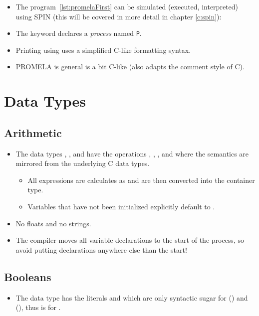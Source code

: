 		\begin{itemize}
			\item The program~\ref{lst:promelaFirst} can be simulated (executed, interpreted) using SPIN (this will be covered in more detail in chapter \ref{c:spin}):
			\item The keyword  declares a \textit{process} named \texttt{P}.
			\item Printing using  uses a simplified C-like formatting syntax.
			\item PROMELA is general is a bit C-like (also adapts the comment style of C).
		\end{itemize}

	\section{Data Types}
		\subsection{Arithmetic}
			\begin{itemize}
				\item The data types , ,  and  have the operations \inlinePromela{+}, \inlinePromela{-}, \inlinePromela{*}, \inlinePromela{/} and \inlinePromela{\%} where the semantics are mirrored from the underlying C data types.
					\begin{itemize}
						\item All expressions are calculates as  and are then converted into the container type.
						\item Variables that have not been initialized explicitly default to .
					\end{itemize}
				\item No floats and no strings.
				\item The compiler moves all variable declarations to the start of the process, so avoid putting declarations anywhere else than the start!
			\end{itemize}

		\subsection{Booleans}
			\begin{itemize}
				\item The data type  has the literals  and  which are only syntactic sugar for  () and  (), thus is  for .
			\end{itemize}

